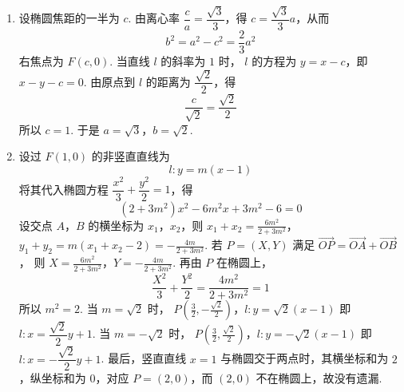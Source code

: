 \begin{solution}
\begin{enumerate}
\item 设椭圆焦距的一半为 \(c\). 由离心率
\(\dfrac ca=\dfrac{\sqrt3}{3}\)，得
\(c=\dfrac{\sqrt3}{3}a\)，从而
\[
b^2=a^2-c^2=\frac23a^2
\]
右焦点为 \(F(c,0)\). 当直线 \(l\) 的斜率为 \(1\) 时，
\(l\) 的方程为 \(y=x-c\)，即 \(x-y-c=0\). 由原点到
\(l\) 的距离为 \(\dfrac{\sqrt2}{2}\)，得
\[
\frac c{\sqrt2}=\frac{\sqrt2}{2}
\]
所以 \(c=1\). 于是 \(a=\sqrt3\)，\(b=\sqrt2\).
\item 设过 \(F(1,0)\) 的非竖直直线为
\[
l:y=m(x-1)
\]
将其代入椭圆方程
\(\dfrac{x^2}{3}+\dfrac{y^2}{2}=1\)，得
\[
(2+3m^2)x^2-6m^2x+3m^2-6=0
\]
设交点 \(A\)，\(B\) 的横坐标为 \(x_1\)，\(x_2\)，则
\(x_1+x_2=\frac{6m^2}{2+3m^2}\)，\(y_1+y_2=m(x_1+x_2-2) =-\frac{4m}{2+3m^2}\).
若 \(P=(X,Y)\) 满足
\(\overrightarrow{OP}=\overrightarrow{OA}+\overrightarrow{OB}\)，
则
\(X=\frac{6m^2}{2+3m^2}\)，\(Y=-\frac{4m}{2+3m^2}\).
再由 \(P\) 在椭圆上，
\[
\frac{X^2}{3}+\frac{Y^2}{2}
=\frac{4m^2}{2+3m^2}=1
\]
所以 \(m^2=2\). 当 \(m=\sqrt2\) 时，
\(P\left(\frac32,-\frac{\sqrt2}{2}\right)\)，\(l:y=\sqrt2(x-1)\)
即 \(l:x=\dfrac{\sqrt2}{2}y+1\). 当 \(m=-\sqrt2\) 时，
\(P\left(\frac32,\frac{\sqrt2}{2}\right)\)，\(l:y=-\sqrt2(x-1)\)
即 \(l:x=-\dfrac{\sqrt2}{2}y+1\).
最后，竖直直线 \(x=1\) 与椭圆交于两点时，其横坐标和为
\(2\)，纵坐标和为 \(0\)，对应 \(P=(2,0)\)，而
\((2,0)\) 不在椭圆上，故没有遗漏.
\end{enumerate}
\end{solution}
